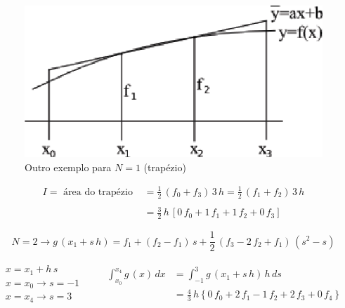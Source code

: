 \begin{example}


\begin{figure}[htb]
 \centering
 \includegraphics[scale=1.0]{capitulos/capitulo2/figuras/formula_newton_cotes2.eps}
 \caption{Outro exemplo para $N = 1$ (trapézio)}
 \label{fig:formula_newton_cotes2}
\end{figure}

\[
 \begin{array}{ll}
  I = \mbox{ área do trapézio } & = \displaystyle \frac{1}{2} \, (f_0 + f_3) \, 3\,h = \frac{1}{2} \, (f_1 + f_2) \, 3\,h \\ \\
                                & = \displaystyle \frac{3}{2} \, h \, [0 \, f_0 + 1 \, f_1 + 1 \, f_2 + 0 \, f_3]
 \end{array}
\]

\[
 N = 2 \rightarrow g\,(x_1 + s\,h) = f_1 + (f_2 - f_1) \, s + \frac{1}{2} \, (f_3 - 2\,f_2 + f_1)\,(s^2 - s)
\]

\[
\begin{array}{l}
 \begin{array}{l}
  x = x_1 + h\,s \\
  x = x_0 \rightarrow s = -1 \\
  x = x_4 \rightarrow s = 3
 \end{array}
 \qquad
 \begin{array}{ll}
  \displaystyle \int_{x_0}^{x_4} g\,(x) \, dx & = \displaystyle \int_{-1}^3 g\,(x_1 + s\,h) \, h\,ds \\
                                & = \displaystyle \frac{4}{3} \, h \left\{ 0\,f_0 + 2\,f_1 - 1\,f_2 + 2\,f_3 + 0\,f_4 \right\}
 \end{array}
\end{array}
\]

\end{example}

